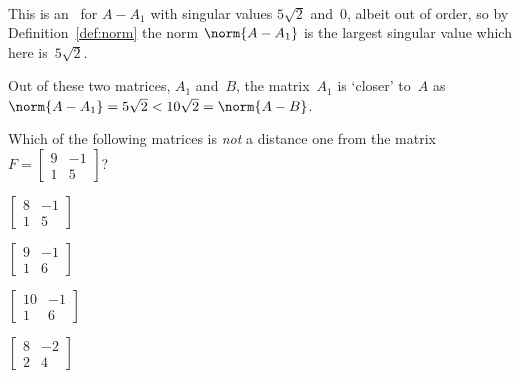 \begin{example}
\begin{enumerate}
\begin{enumerate}
\begin{solution}
\begin{eqnarray*}
\end{eqnarray*}
This is an \svd\ for \(A-A_1\) with singular values \(5\sqrt2\) and~\(0\), albeit out of order, so by Definition~\ref{def:norm} the norm \(\norm{A-A_1}\) is the largest singular value which here is~\(5\sqrt2\).
\end{solution}
\end{enumerate}
Out of these two matrices, \(A_1\) and~\(B\), the matrix~\(A_1\) is `closer' to~\(A\) as \(\norm{A-A_1}=5\sqrt2<10\sqrt2=\norm{A-B}\).
\end{enumerate}
\end{example}




\begin{activity}
Which of the following matrices is \emph{not} a distance one from the matrix \(F=\begin{bmatrix} 9&-1\\1&5 \end{bmatrix}\)?
\begin{parts}
\item \(\begin{bmatrix} 8&-1\\1&5 \end{bmatrix}\)
\item \(\begin{bmatrix} 9&-1\\1&6 \end{bmatrix}\)
\item \(\begin{bmatrix} 10&-1\\1&6 \end{bmatrix}\)
\item \(\begin{bmatrix} 8&-2\\2&4 \end{bmatrix}\)
\end{parts}
\end{activity}





